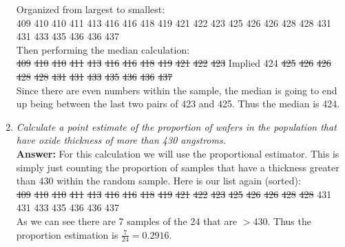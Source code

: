 \documentclass[11pt]{article}
\begin{document}
\begin{enumerate}
Organized from largest to smallest:\\
409 410 410  411 413 416 416 418 419 421 422 423 425 426 426 428 428 431 431 433 435 436 436 437
\\Then performing the median calculation:\\
\sout{409} \sout{410} \sout{410}  \sout{411} \sout{413} \sout{416} \sout{416} \sout{418} \sout{419} \sout{421} \sout{422} \sout{423} Implied 424 \sout{425} \sout{426} \sout{426} \sout{428} \sout{428} \sout{431} \sout{431} \sout{433} \sout{435} \sout{436} \sout{436} \sout{437}
\\Since there are even numbers within the sample, the median is going to end up being between the last two pairs of 423 and 425. Thus the median is 424.
\item \emph{Calculate a point estimate of the proportion of wafers in the population that have oxide thickness of more than 430 angstroms.}
\\\textbf{Answer:} For this calculation we will use the proportional estimator. This is simply just counting the proportion of samples that have a thickness greater than 430 within the random sample. Here is our list again (sorted):\\
\sout{409} \sout{410} \sout{410}  \sout{411} \sout{413} \sout{416} \sout{416} \sout{418} \sout{419} \sout{421} \sout{422} \sout{423}  \sout{425} \sout{426} \sout{426} \sout{428} \sout{428} 431 431 433 435 436 436 437\\
As we can see there are 7 samples of the 24 that are $> 430$. Thus the proportion estimation is $\frac{7}{24} = 0.2916$.


\end{enumerate}
\end{document}
